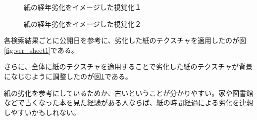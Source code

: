 \begin{figure}[htbp]
  \begin{minipage}{0.5\hsize}
    \begin{center}
    \end{center}
    \caption{紙の経年劣化をイメージした視覚化１}
    \label{fig:ver_sheet1}
  \end{minipage}
  \begin{minipage}{0.5\hsize}
    \begin{center}
    \end{center}
    \caption{紙の経年劣化をイメージした視覚化２}
    \label{fig:ver_sheet2}
  \end{minipage}
\end{figure}

各検索結果ごとに公開日を参考に、劣化した紙のテクスチャを適用したのが図\ref{fig:ver_sheet1}である。

さらに、全体に紙のテクスチャを適用することで劣化した紙のテクスチャが背景になじむように調整したのが図\ref{fig:ver_sheet2}である。

紙の劣化を参考にしているためか、古いということが分かりやすい。家や図書館などで古くなった本を見た経験がある人ならば、紙の時間経過による劣化を連想しやすいかもしれない。

